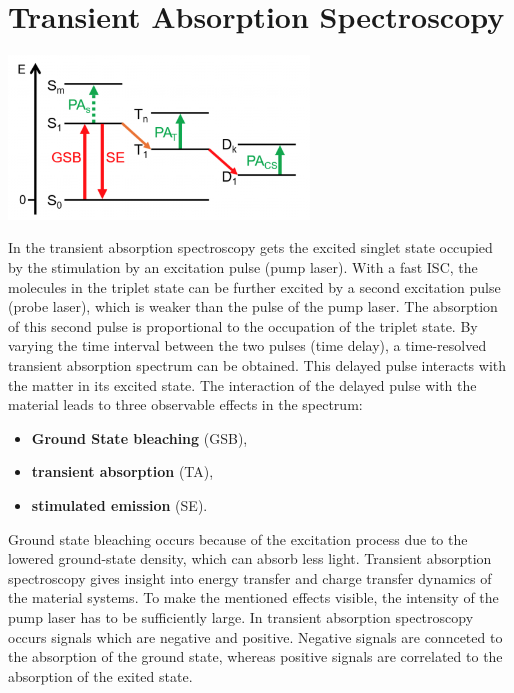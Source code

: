 \newpage
\section{Transient Absorption Spectroscopy}
\label{sec:transientTheory}

\begin{center}
    \captionsetup{type = figure}
    \includegraphics[width = 0.6\textwidth]{Pictures/Transient-Absorption.png}
    \label{fig:transient}
\end{center}

In the transient absorption spectroscopy gets the excited singlet state occupied by the stimulation by an excitation pulse (pump laser). With a fast ISC, the molecules in the triplet state can be further excited by a second excitation pulse (probe laser), which is weaker than the pulse of the pump laser. The absorption of this second pulse is proportional to the occupation of the triplet state. By varying the time interval between the two pulses (time delay), a time-resolved transient absorption spectrum can be obtained. This delayed pulse interacts with the matter in its excited state. The interaction of the delayed pulse with the material leads to three observable effects in the spectrum: 
\begin{itemize}
    \item \textbf{Ground State bleaching} (GSB),
    \item \textbf{transient absorption} (TA),
    \item \textbf{stimulated emission} (SE).
\end{itemize}
Ground state bleaching occurs because of the excitation process due to the lowered ground-state density, which can absorb less light. Transient absorption spectroscopy gives insight into energy transfer and charge transfer dynamics of the material systems. To make the mentioned effects visible, the intensity of the pump laser has to be sufficiently large. \cite{JulienFrancoisGorenflot.2015}
In transient absorption spectroscopy occurs signals which are negative and positive. Negative signals are connceted to the absorption of the ground state, whereas positive signals are correlated to the absorption of the exited state. \cite{Kennis.2009}

